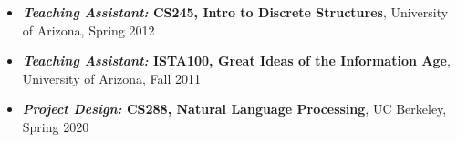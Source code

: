 \begin{itemize}[leftmargin=-0.4mm,partopsep=0pt,label=]
\item \textbf{\emph{Teaching Assistant:} CS245, Intro to Discrete Structures}, University of Arizona, Spring 2012

\item \textbf{\emph{Teaching Assistant:} ISTA100, Great Ideas of the Information Age}, University of Arizona, Fall 2011




\item \textbf{\emph{Project Design:} CS288, Natural Language Processing}, UC Berkeley, Spring 2020
\end{itemize}


